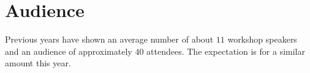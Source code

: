 \documentclass[10pt]{article}
\begin{document}
\begin{itemize}






\end{itemize}

\section*{Audience}
Previous years have shown an average number of about $11$ workshop
speakers and an audience of approximately $40$ attendees. The
expectation is for a similar amount this year.
\end{document}

